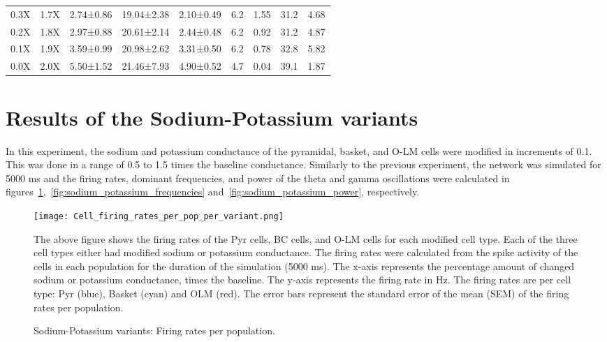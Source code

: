 \begin{table}[htbp]
\begin{adjustbox}{width=\textwidth}
\begin{tabular}{ccccccccc}
            0.3X       & 1.7X        & 2.74±0.86                     & 19.04±2.38 & 2.10±0.49 & 6.2 & 1.55 & 31.2 & 4.68 \\
            0.2X       & 1.8X        & 2.97±0.88                     & 20.61±2.14 & 2.44±0.48 & 6.2 & 0.92 & 31.2 & 4.87 \\
            0.1X       & 1.9X        & 3.59±0.99                     & 20.98±2.62 & 3.31±0.50 & 6.2 & 0.78 & 32.8 & 5.82 \\
            0.0X       & 2.0X        & 5.50±1.52                     & 21.46±7.93 & 4.90±0.52 & 4.7 & 0.04 & 39.1 & 1.87 \\
            \hline
        \end{tabular}
    \end{adjustbox}
\end{table}
\pagebreak
\section{Results of the Sodium-Potassium variants}
In this experiment, the sodium and potassium conductance of the pyramidal, basket, and O-LM cells were modified in increments of 0.1.
This was done in a range of 0.5 to 1.5 times the baseline conductance.
Similarly to the previous experiment, the network was simulated for 5000 ms and the firing rates, dominant frequencies, and power of the theta and gamma oscillations were calculated in figures~\ref{fig:sodium_potassium_firing_rates},~\ref{fig:sodium_potassium_frequencies} and~\ref{fig:sodium_potassium_power}, respectively.

\begin{figure}[htbp]
    \centering
    \texttt{[image: Cell\_firing\_rates\_per\_pop\_per\_variant.png]}
    \caption[Sodium-Potassium variants: Firing rates per population]{Sodium-Potassium variants: Firing rates per population.}\label{fig:sodium_potassium_firing_rates}
    \begin{minipage}{0.9\textwidth}
        The above figure shows the firing rates of the Pyr cells, BC cells, and O-LM cells for each modified cell type.
        Each of the three cell types either had modified sodium or potassium conductance.
        The firing rates were calculated from the spike activity of the cells in each population for the duration of the simulation (5000 ms).
        The x-axis represents the percentage amount of changed sodium or potassium conductance, times the baseline.
        The y-axis represents the firing rate in Hz.
        The firing rates are per cell type: Pyr (blue), Basket (cyan) and OLM (red).
        The error bars represent the standard error of the mean (SEM) of the firing rates per population.
    \end{minipage}
\end{figure}


